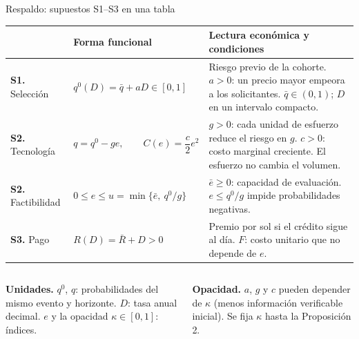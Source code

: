 \documentclass[aspectratio=169,10pt,t]{beamer}
\newcommand{\qz}{q^{0}}
\newcommand{\eb}{\bar e}
\begin{document}
\begin{frame}{Respaldo: supuestos S1--S3 en una tabla}
\vspace{1.5mm}
\small
\renewcommand{\arraystretch}{1.18}
\begin{tabular}{@{}>{\raggedright\arraybackslash}p{.19\linewidth}
  >{\raggedright\arraybackslash}p{.30\linewidth}
  >{\raggedright\arraybackslash}p{.44\linewidth}@{}}
\toprule
& \textbf{Forma funcional} & \textbf{Lectura económica y condiciones}\\\midrule
\textbf{S1.} Selección &
$\qz(D)=\bar q+aD\in[0,1]$ &
Riesgo previo de la cohorte. $a>0$: un precio mayor empeora a los solicitantes.
$\bar q\in(0,1)$; $D$ en un intervalo compacto.\\
\textbf{S2.} Tecnología &
$q=\qz-ge,\qquad C(e)=\dfrac{c}{2}e^{2}$ &
$g>0$: cada unidad de esfuerzo reduce el riesgo en $g$. $c>0$: costo marginal
creciente. El esfuerzo no cambia el volumen.\\
\textbf{S2.} Factibilidad &
$0\le e\le u=\min\{\eb,\ \qz/g\}$ &
$\eb\ge 0$: capacidad de evaluación. $e\le \qz/g$ impide probabilidades
negativas.\\
\textbf{S3.} Pago &
$R(D)=\bar R+D>0$ &
Premio por sol si el crédito sigue al día. $F$: costo unitario que no depende
de $e$.\\\bottomrule
\end{tabular}
\vspace{1.5mm}
\begin{columns}[T,onlytextwidth]
\begin{plainbox}\footnotesize
\textbf{Unidades.} $\qz$, $q$: probabilidades del mismo evento y horizonte. $D$:
tasa anual decimal. $e$ y la opacidad $\kappa\in[0,1]$: índices.
\end{plainbox}
\begin{plainbox}\footnotesize
\textbf{Opacidad.} $a$, $g$ y $c$ pueden depender de $\kappa$ (menos información
verificable inicial). Se fija $\kappa$ hasta la Proposición 2.
\end{plainbox}
\end{columns}
\end{frame}
\end{document}
